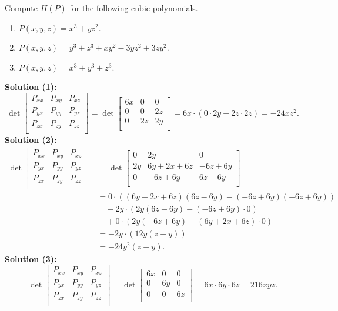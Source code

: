 \begin{tcolorbox}[title=Problem 22, breakable]
    Compute $H(P)$ for the following cubic polynomials.
    \begin{enumerate}
        \item $P(x, y, z) = x^3 + y z^2$.
        \item $P(x, y, z) = y^3 + z^3 + x y^2 - 3 y z^2  + 3 z y^2$.
        \item $P(x, y, z) = x^3 + y^3 + z^3$.
    \end{enumerate}
\end{tcolorbox}

\textbf{Solution (1):}
\[
\det 
\begin{bmatrix}
    P_{xx} & P_{xy} & P_{xz} \\
    P_{yx} & P_{yy} & P_{yz} \\
    P_{zx} & P_{zy} & P_{zz} \\
\end{bmatrix} 
=
\det 
\begin{bmatrix}
6x & 0 & 0 \\
0 & 0 & 2z \\
0 & 2z & 2y \\
\end{bmatrix} 
= 6x \cdot (0 \cdot 2y - 2z \cdot 2z) = -24 x z^2.
\]
\textbf{Solution (2):}
\begin{align*}
\det 
\begin{bmatrix}
    P_{xx} & P_{xy} & P_{xz} \\
    P_{yx} & P_{yy} & P_{yz} \\
    P_{zx} & P_{zy} & P_{zz} \\
\end{bmatrix} 
&=
\det 
\begin{bmatrix}
0 & 2y & 0 \\
2y & 6y + 2x + 6z & -6z + 6y \\
0 & -6z + 6y & 6z - 6y \\
\end{bmatrix} \\[2mm]
&= 0 \cdot ((6y+2x+6z)(6z-6y) - (-6z+6y)(-6z+6y)) \\ 
&\quad - 2y \cdot (2y (6z-6y) - (-6z+6y)\cdot 0) \\
&\quad + 0 \cdot (2y(-6z+6y) - (6y+2x+6z)\cdot 0) \\[1mm]
&= -2y \cdot (12y(z-y)) \\[1mm]
&= -24 y^2 (z-y).
\end{align*}
\textbf{Solution (3):}
\[
\det 
\begin{bmatrix}
    P_{xx} & P_{xy} & P_{xz} \\
    P_{yx} & P_{yy} & P_{yz} \\
    P_{zx} & P_{zy} & P_{zz} \\
\end{bmatrix} 
=
\det 
\begin{bmatrix}
6x & 0 & 0 \\
0 & 6y & 0 \\
0 & 0 & 6z \\
\end{bmatrix} 
= 6x \cdot 6y \cdot 6z = 216 xyz.
\]

